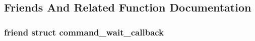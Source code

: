 \subsection{Friends And Related Function Documentation}
\hypertarget{classedthreaded__fd_a51b319f0e7d155dc96111998cbf641e2}{
\subsubsection[{command\-\_\-wait\-\_\-callback}]{\setlength{\rightskip}{0pt plus 5cm}friend struct {\bf command\-\_\-wait\-\_\-callback}\hspace{0.3cm}{\ttfamily [friend]}}}\label{classedthreaded__fd_a51b319f0e7d155dc96111998cbf641e2}


